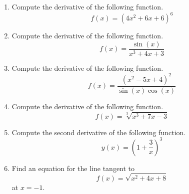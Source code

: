 \documentclass{article}
\begin{document}
\ActivityTitle[class=Calculus I, number=4, name=Differentiation II (Solutions)]

\begin{enumerate}
\item Compute the derivative of the following function. \[ f(x) = (4 x^2 + 6 x + 6)^{6} \]

  
\vspace{1cm}

\item Compute the derivative of the following function. \[ f(x) = \frac{\sin(x)}{x^3 + 4 x + 3} \]

  
\vspace{1cm}

\item Compute the derivative of the following function. \[ f(x) = \frac{(x^2 - 5 x + 4)^{2}}{\sin(x)\cos(x)} \]

  
\vspace{1cm}

\item Compute the derivative of the following function. \[ f(x) = \sqrt[3]{x^3 + 7 x - 3} \]

  
\vspace{1cm}

\item Compute the second derivative of the following function. \[ y(x) = \left( 1 + \frac{3}{x} \right)^{3} \]

  
\vspace{1cm}

\item Find an equation for the line tangent to \[ f(x) = \sqrt{x^2 + 4 x + 8} \] at $x = -1$.

  
\vspace{1cm}
\end{enumerate}
\end{document}
